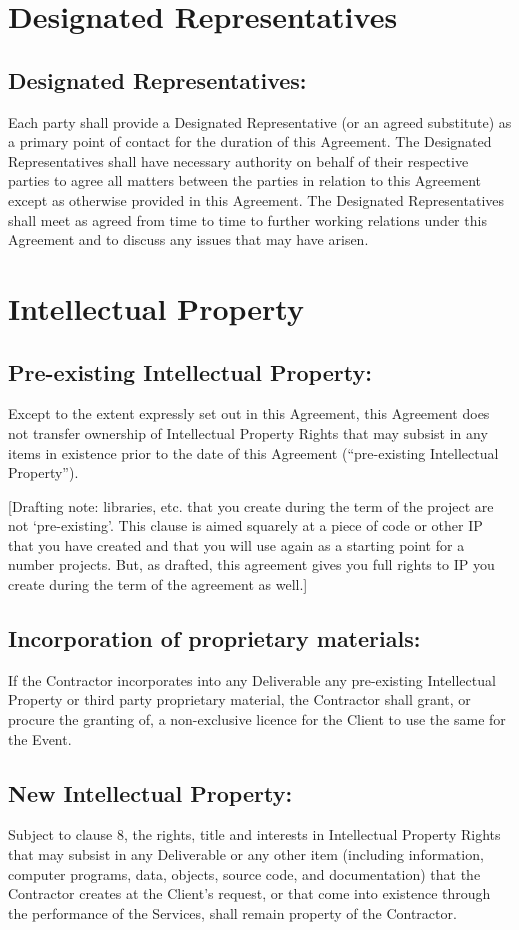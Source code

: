 \documentclass[a4paper,12pt]{article}
\begin{document}
\section{Designated Representatives}
\subsection{Designated Representatives:}  Each party shall provide a Designated Representative (or an agreed substitute) as a primary point of contact for the duration of this Agreement.  The Designated Representatives shall have necessary authority on behalf of their respective parties to agree all matters between the parties in relation to this Agreement except as otherwise provided in this Agreement.  The Designated Representatives shall meet as agreed from time to time to further working relations under this Agreement and to discuss any issues that may have arisen.
\section{Intellectual Property}
\subsection{Pre-existing Intellectual Property:}  Except to the extent expressly set out in this Agreement, this Agreement does not transfer ownership of Intellectual Property Rights that may subsist in any items in existence prior to the date of this Agreement (“pre-existing Intellectual Property”).  

[Drafting note:  libraries, etc. that you create during the term of the project are not ‘pre-existing’.  This clause is aimed squarely at a piece of code or other IP that you have created and that you will use again as a starting point for a number projects.  But, as drafted, this agreement gives you full rights to IP you create during the term of the agreement as well.]

\subsection{Incorporation of proprietary materials:} If the Contractor incorporates into any Deliverable any pre-existing Intellectual Property or third party proprietary material, the Contractor shall grant, or procure the granting of, a non-exclusive licence for the Client to use the same for the Event.
\subsection{New Intellectual Property:}  Subject to clause 8, the rights, title and interests in Intellectual Property Rights that may subsist in any Deliverable or any other item (including information, computer programs, data, objects, source code, and documentation) that the Contractor creates at the Client’s request, or that come into existence through the performance of the Services, shall remain property of the Contractor.  
\end{document}
